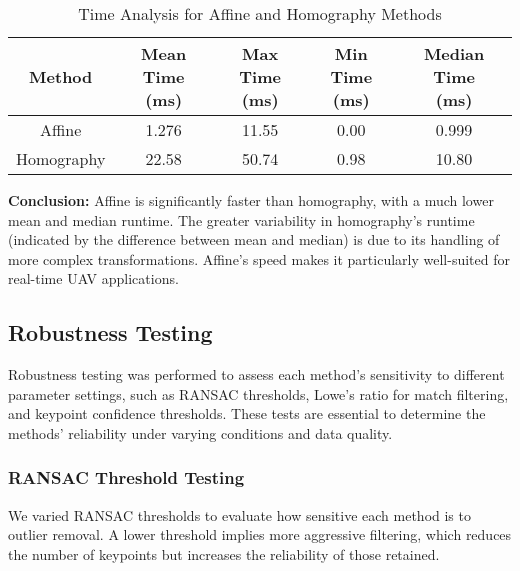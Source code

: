 \begin{table}[H]
    \centering
    \begin{tabular}{|c|c|c|c|c|}
        \hline
        \textbf{Method} & \makecell{\textbf{Mean Time} \\ \textbf{(ms)}} & \makecell{\textbf{Max Time} \\ \textbf{(ms)}} & \makecell{\textbf{Min Time} \\ \textbf{(ms)}} & \makecell{\textbf{Median Time} \\ \textbf{(ms)}} \\
        \hline
        Affine & 1.276 & 11.55 & 0.00 & 0.999 \\  
        Homography & 22.58 & 50.74 & 0.98 & 10.80 \\  
        \hline
    \end{tabular}
    \caption{Time Analysis for Affine and Homography Methods}
\end{table}

\textbf{Conclusion:} Affine is significantly faster than homography, with a much lower mean and median runtime. The greater variability in homography’s runtime (indicated by the difference between mean and median) is due to its handling of more complex transformations. Affine’s speed makes it particularly well-suited for real-time UAV applications.

\subsection{Robustness Testing}
Robustness testing was performed to assess each method's sensitivity to different parameter settings, such as RANSAC thresholds, Lowe’s ratio for match filtering, and keypoint confidence thresholds. These tests are essential to determine the methods’ reliability under varying conditions and data quality.

\subsubsection{RANSAC Threshold Testing}
We varied RANSAC thresholds to evaluate how sensitive each method is to outlier removal. A lower threshold implies more aggressive filtering, which reduces the number of keypoints but increases the reliability of those retained.

